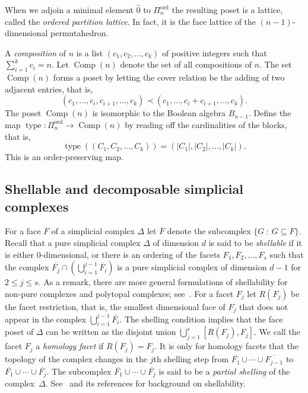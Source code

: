 \documentclass[ALCO,ThmDefs,Unicode,epreuves]{cedram}
\DeclareMathOperator{\Comp}{Comp}
\DeclareMathOperator{\type}{type}
\DeclareMathOperator{\ord}{ord}
\newcommand{\hz}{\hat{0}}
\newcommand{\coveredby}{\prec}
\newcommand{\cupdots}{\cup \cdots \cup}
\newcommand{\Qn}{\Pi^{\ord}_{n}}
\begin{document}
When we adjoin a minimal element $\hz$ to $\Qn$
the resulting poset is a lattice,
called the \emph{ordered partition lattice}. In fact, it is
the face lattice of the $(n-1)$-dimensional permutahedron.


A \emph{composition} of $n$ is a list 
$(c_{1}, c_{2}, \ldots, c_{k})$ of positive integers
such that $\sum_{i=1}^{k} c_{i} = n$.
Let $\Comp(n)$ denote the set of all compositions of $n$.
The set $\Comp(n)$ forms a poset by letting
the cover relation be the adding of two adjacent entries,
that is,
$$
(c_{1}, \ldots, c_{i}, c_{i+1}, \ldots, c_{k})
\coveredby
(c_{1}, \ldots, c_{i} + c_{i+1}, \ldots, c_{k}) .
$$
The poset $\Comp(n)$ is isomorphic to the Boolean algebra $B_{n-1}$.
Define the map $\type : \Qn \longrightarrow \Comp(n)$
by reading off the cardinalities of the blocks, that is,
$$ \type((C_{1}, C_{2}, \ldots, C_{k})) = (|C_{1}|, |C_{2}|, \ldots, |C_{k}|) . $$
This is an order-preserving map. 

\subsection{Shellable and decomposable simplicial complexes}

For a face $F$ of a simplicial complex $\Delta$
let $\overline{F}$ denote the subcomplex
$\{G \: : \: G \subseteq F\}$.
Recall that a pure simplicial complex $\Delta$ 
of dimension $d$ is said to be
\emph{shellable} if 
it is either $0$-dimensional, or
there is an ordering of the facets $F_{1}, F_{2}, \ldots, F_{s}$
such that  the complex
$\overline{F_{j}} \cap \left(\bigcup_{i=1}^{j-1} \overline{F_{i}}\right)$
is a pure simplicial complex of dimension $d-1$ for $2 \leq j \leq s$.
As a remark, there are more general formulations of 
shellability for non-pure
complexes and polytopal complexes; see~\cite{Bjorner_Wachs}.
For a facet $F_{j}$ let $R(F_{j})$ be the 
facet restriction, that is, the smallest dimensional face
of $F_{j}$ that does not appear in the complex
$\bigcup_{i=1}^{j-1} \overline{F_{i}}$.
The shelling condition implies
that the face poset of $\Delta$ can be written as the disjoint union
$\bigcup_{j=1}^{s} [R(F_{j}), F_{j}]$.
We call the facet $F_{j}$ a \emph{homology facet}
if $R(F_{j}) = F_{j}$.
It is only for homology facets that the topology
of the complex 
changes in the $j$th shelling step from
$\overline{F_{1}} \cupdots \overline{F_{j-1}}$
to
$\overline{F_{1}} \cupdots \overline{F_{j}}$.
The subcomplex
$\overline{F_{1}} \cupdots \overline{F_{j}}$
is said to be a
\emph{partial shelling} 
of the complex~$\Delta$.
See~\cite{Bjorner,Stanley_green} and its references for background on shellability.
\end{document}
